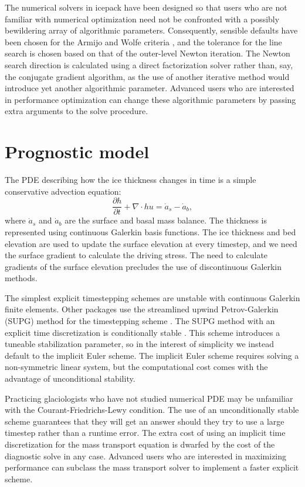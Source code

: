 \documentclass{article}
\theoremstyle{definition}
\theoremstyle{plain}
\begin{document}
The numerical solvers in icepack have been designed so that users who are not familiar with numerical optimization need not be confronted with a possibly bewildering array of algorithmic parameters.
Consequently, sensible defaults have been chosen for the Armijo and Wolfe criteria \citep{nocedal2006numerical}, and the tolerance for the line search is chosen based on that of the outer-level Newton iteration.
The Newton search direction is calculated using a direct factorization solver rather than, say, the conjugate gradient algorithm, as the use of another iterative method would introduce yet another algorithmic parameter.
Advanced users who are interested in performance optimization can change these algorithmic parameters by passing extra arguments to the solve procedure.


\section{Prognostic model} \label{sec:prognostic-model}

The PDE describing how the ice thickness changes in time is a simple conservative advection equation:
\begin{equation}
    \frac{\partial h}{\partial t} + \nabla\cdot hu = \dot a_s - \dot a_b,
\end{equation}
where $\dot a_s$ and $\dot a_b$ are the surface and basal mass balance.
The thickness is represented using continuous Galerkin basis functions.
The ice thickness and bed elevation are used to update the surface elevation at every timestep, and we need the surface gradient to calculate the driving stress.
The need to calculate gradients of the surface elevation precludes the use of discontinuous Galerkin methods.

The simplest explicit timestepping schemes are unstable with continuous Galerkin finite elements.
Other packages use the streamlined upwind Petrov-Galerkin (SUPG) method for the timestepping scheme \citep{brinkerhoff2013data, larour2012continental}.
The SUPG method with an explicit time discretization is conditionally stable \citep{donea2003finite}.
This scheme introduces a tuneable stabilization parameter, so in the interest of simplicity we instead default to the implicit Euler scheme.
The implicit Euler scheme requires solving a non-symmetric linear system, but the computational cost comes with the advantage of unconditional stability.

Practicing glaciologists who have not studied numerical PDE may be unfamiliar with the Courant-Friedrichs-Lewy condition.
The use of an unconditionally stable scheme guarantees that they will get an answer should they try to use a large timestep rather than a runtime error.
The extra cost of using an implicit time discretization for the mass transport equation is dwarfed by the cost of the diagnostic solve in any case.
Advanced users who are interested in maximizing performance can subclass the mass transport solver to implement a faster explicit scheme.
\end{document}
